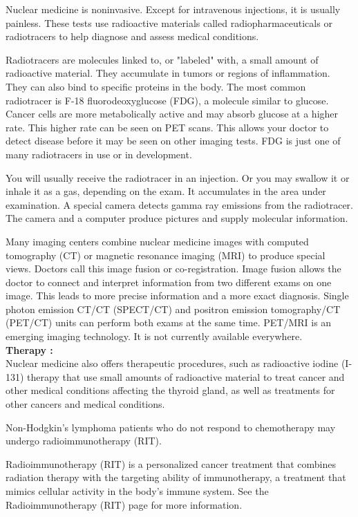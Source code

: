 \documentclass[12pt]{article}
\begin{document}
\noindent Nuclear medicine is noninvasive. Except for intravenous injections, it is usually painless. These tests use radioactive materials called radiopharmaceuticals or radiotracers to help diagnose and assess medical conditions.

\noindent Radiotracers are molecules linked to, or "labeled" with, a small amount of radioactive material. They accumulate in tumors or regions of inflammation. They can also bind to specific proteins in the body. The most common radiotracer is F-18 fluorodeoxyglucose (FDG), a molecule similar to glucose. Cancer cells are more metabolically active and may absorb glucose at a higher rate. This higher rate can be seen on PET scans. This allows your doctor to detect disease before it may be seen on other imaging tests. FDG is just one of many radiotracers in use or in development.

\noindent You will usually receive the radiotracer in an injection. Or you may swallow it or inhale it as a gas, depending on the exam. It accumulates in the area under examination. A special camera detects gamma ray emissions from the radiotracer. The camera and a computer produce pictures and supply molecular information.

 
\noindent Many imaging centers combine nuclear medicine images with computed tomography (CT) or magnetic resonance imaging (MRI) to produce special views. Doctors call this image fusion or co-registration. Image fusion allows the doctor to connect and interpret information from two different exams on one image. This leads to more precise information and a more exact diagnosis. Single photon emission CT/CT (SPECT/CT) and positron emission tomography/CT (PET/CT) units can perform both exams at the same time. PET/MRI is an emerging imaging technology. It is not currently available everywhere.
\noindent 
\\ \textbf{\large Therapy :}
\\ Nuclear medicine also offers therapeutic procedures, such as radioactive iodine (I-131) therapy that use small amounts of radioactive material to treat cancer and other medical conditions affecting the thyroid gland, as well as treatments for other cancers and medical conditions.

\noindent Non-Hodgkin's lymphoma patients who do not respond to chemotherapy may undergo radioimmunotherapy (RIT).

\noindent Radioimmunotherapy (RIT) is a personalized cancer treatment that combines radiation therapy with the targeting ability of immunotherapy, a treatment that mimics cellular activity in the body's immune system. See the Radioimmunotherapy (RIT) page for more information.





\end{document}
